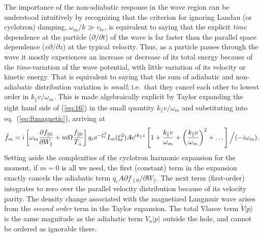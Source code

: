 \documentclass[12pt]{article}
\def\ket#1{|#1\rangle}
\begin{document}
The importance of the non-adiabatic response in the wave region can be
understood intuitively by recognizing that the criterion for ignoring
Landau (or cyclotron) damping, $\omega_m/k\gg v_{te}$, is equivalent
to saying that the explicit \emph{time} dependence at the particle
($\partial/\partial t$) of the wave is far faster than the parallel
space dependence ($v\partial/\partial z$) at the typical
velocity. Thus, as a particle passes through the wave it mostly
experiences an increase or decrease of its total energy because of the
\emph{time}-variation of the wave potential, with little variation of
its velocity or kinetic energy. That is equivalent to saying that the
sum of adiabatic and non-adiabatic distribution variation is
\emph{small}; i.e.\ that they cancel each other to lowest order in
$k_\parallel v/\omega_m$. This is made algebraically explicit by
Taylor expanding the right hand side of (\ref{eq:16}) in the small
quantity $k_\parallel v/\omega_m$ and substituting into eq.\
(\ref{eq:ftmagnetic}), arriving at
\begin{equation}
  \label{eq:17}
  \tilde f_m = i\left[\omega_m
    {\partial f_{\parallel0}\over \partial W_\parallel}
    +m\Omega {f_{\parallel0}\over T_\perp}\right]
  q_e{\rm e}^{-\xi_t^2}I_m(\xi_t^2) A{\rm e}^{ik_\parallel z}
  \left[1+{k_\parallel v\over\omega_m}+
    \left({k_\parallel v\over\omega_m}\right)^2+\dots\right]
  \Big/(-i\omega_m).
\end{equation}
Setting aside the complexities of the cyclotron harmonic expansion
for the moment, if $m=0$ is all we need, the first (constant) term in
the expansion exactly cancels the adiabatic term
$q_eA{\partial f_{\parallel0}/\partial W_\parallel}$. The next
term (first-order) integrates to zero over the parallel velocity
distribution because of its velocity parity. The density change
associated with the magnetized Langmuir wave arises from the
\emph{second order} term in the Taylor expansion. The total Vlasov term
$\tilde{V}\ket{p}$ is the same magnitude as the adiabatic term $V_a\ket{p}$
outside the hole, and cannot be ordered as ignorable there.
\end{document}
